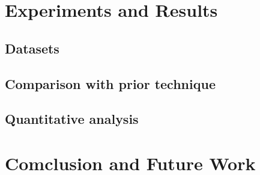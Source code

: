\documentclass[times,10pt,twocolumn,letterpaper]{article}
\begin{document}
\section{Experiments and Results}
\subsection{Datasets}

\subsection{Comparison with prior technique}
\subsection{Quantitative analysis}
\section{Comclusion and Future Work}



\end{document}
